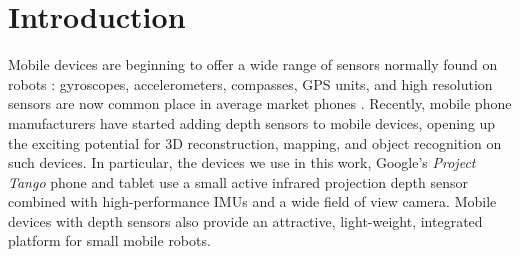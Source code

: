 \documentclass[10pt,twocolumn,letterpaper]{article}
\newcommand{\ssnote}[1]{{\xxnote{SS}{red}{#1}}}
\newcommand{\xxnote}[3]{}
\renewcommand{\xxnote}[3]{\color{#2}{#1: #3}}
\begin{document}
\section{Introduction}

Mobile devices are beginning to offer a wide range of sensors normally found on
robots \ssnote{why does it matter that they're found on robots?}: gyroscopes, accelerometers, compasses, GPS units, and high resolution
sensors \ssnote{like what? what about cameras?} are now common place in average market phones \ssnote{add cite to mobile device specs or survey}. 
Recently, mobile phone
manufacturers have started adding depth sensors to mobile devices, 
opening up the exciting potential for 3D reconstruction, mapping,
and object recognition on such devices. In
particular, the devices we use in this work, Google's \textit{Project Tango} 
\cite{Tango} phone
and tablet use a small active infrared projection depth sensor combined with
high-performance IMUs and a wide field of view camera. Mobile devices with depth
sensors also provide an attractive, light-weight, integrated platform for small mobile robots.
\end{document}

